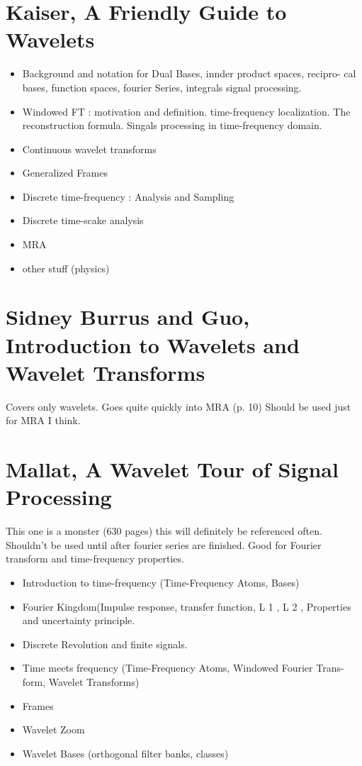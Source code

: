 \section{Kaiser, A Friendly Guide to Wavelets}
\begin{itemize}
    \item Background and notation for Dual Bases, innder product spaces, recipro-
cal bases, function spaces, fourier Series, integrals signal processing.
    \item Windowed FT : motivation and definition. time-frequency localization.
The reconstruction formula. Singals processing in time-frequency domain.
    \item Continuous wavelet transforms
    \item Generalized Frames
    \item Discrete time-frequency : Analysis and Sampling
    \item Discrete time-scake analysis
    \item MRA
    \item other stuff (physics)
\end{itemize}

\section{Sidney Burrus and Guo, Introduction to Wavelets and Wavelet Transforms}
\label{sec:Sidney Burrus and Guo, Introduction to Wavelets and Wavelet Transforms}
Covers only wavelets. Goes quite quickly into MRA (p. 10) Should be used just
for MRA I think.

\section{Mallat, A Wavelet Tour of Signal Processing}
\label{sec:Mallat, A Wavelet Tour of Signal Processing}
This one is a monster (630 pages) this will definitely be referenced often. Shouldn’t
be used until after fourier series are finished. Good for Fourier transform and
time-frequency properties.
\begin{itemize}  
  \item Introduction to time-frequency (Time-Frequency Atoms, Bases)
  \item Fourier Kingdom(Impulse response, transfer function, L 1 , L 2 , Properties
and uncertainty principle.
 \item Discrete Revolution and finite signals.
 \item Time meets frequency (Time-Frequency Atoms, Windowed Fourier Trans-
form, Wavelet Transforms)
 \item Frames
 \item Wavelet Zoom
 \item Wavelet Bases (orthogonal filter banks, classes)
\end{itemize}

